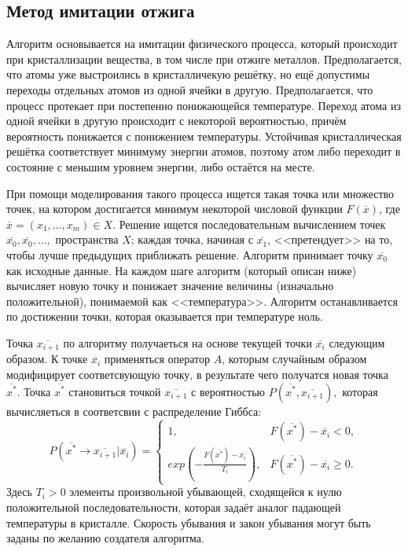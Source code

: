 \documentclass[11pt]{article}
\numberwithin{equation}{section}
\begin{document}
\subsection{Метод имитации отжига}
Алгоритм основывается на имитации физического процесса, который происходит при кристаллизации вещества, в том числе при отжиге металлов.
Предполагается, что атомы уже выстроились в кристалличекую решётку, но ещё допустимы переходы отдельных атомов из одной ячейки в другую.
Предполагается, что процесс протекает при постепенно понижающейся температуре.
Переход атома из одной ячейки в другую происходит с некоторой вероятностью, причём вероятность понижается с понижением температуры.
Устойчивая кристаллическая решётка соответствует минимуму энергии атомов, поэтому атом либо переходит в состояние с меньшим уровнем энергии, либо остаётся на месте.

При помощи моделирования такого процесса ищется такая точка или множество точек, на котором достигается минимум некоторой числовой функции $F(\overline{x})$, где $ \overline{x} = (x_1, \dots, x_m) \in X$. 
Решение ищется последовательным вычислением точек $\overline{x_0}, \overline{x_0}, \dots ,$ пространства $X$; каждая точка, начиная с $\overline{x_1}$,
<<претендует>> на то, чтобы лучше предыдущих приближать решение. 
Алгоритм принимает точку $\overline{x_0}$ как исходные данные.
На каждом шаге алгоритм (который описан ниже) вычисляет новую точку и понижает значение величины (изначально положительной),
понимаемой как <<температура>>. Алгоритм останавливается по достижении точки, которая оказывается при температуре ноль.

Точка $\overline{x_{i+1}}$ по алгоритму получаеться на основе текущей точки $\overline{x_i}$
следующим образом. К точке $\overline{x_i}$ применяться оператор $A$, которым случайным образом модифицирует соответсвующую точку, 
в результате чего получатся новая точка $\overline{x^*}.$ Точка $\overline{x^*}$
становиться точкой $\overline{x_{i+1}}$ с вероятностью $P(\overline{x^*},\overline{x_{i+1}}),$ которая вычисляеться в соответсвии с распределение Гиббса:
\begin{equation*}
  P(\overline{x^*} \to \overline{x_{i+1}}|\overline{x_{i}}) = 
   \begin{cases}
     1, & F(\overline{x^*}) - \overline{x_i}<0, \\
     exp(-\frac{F(\overline{x^*}) - \overline{x_i}}{T_i}), & F(\overline{x^*}) - \overline{x_i} \geq 0.
   \end{cases}
\end{equation*}
Здесь $T_i>0$ элементы произвольной убывающей, сходящейся к нулю положительной последовательности,
которая задаёт аналог падающей температуры в кристалле.
Скорость убывания и закон убывания могут быть заданы по желанию создателя алгоритма.
\end{document}
